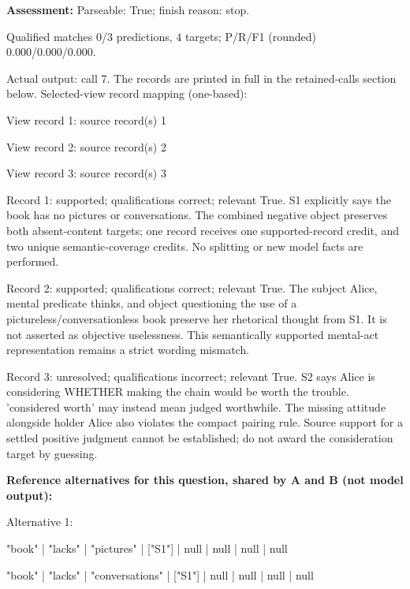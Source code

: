 \noindent\textbf{Assessment:} Parseable: True; finish reason: stop.

Qualified matches 0/3 predictions, 4 targets; P/R/F1 (rounded) 0.000/0.000/0.000.\par

Actual output: call 7. The records are printed in full in the retained-calls section below. Selected-view record mapping (one-based):

View record 1: source record(s) 1\par

View record 2: source record(s) 2\par

View record 3: source record(s) 3\par

\noindent Record 1: supported; qualifications correct; relevant True. S1 explicitly says the book has no pictures or conversations. The combined negative object preserves both absent-content targets; one record receives one supported-record credit, and two unique semantic-coverage credits. No splitting or new model facts are performed.\par\smallskip

\noindent Record 2: supported; qualifications correct; relevant True. The subject Alice, mental predicate thinks, and object questioning the use of a pictureless/conversationless book preserve her rhetorical thought from S1. It is not asserted as objective uselessness. This semantically supported mental-act representation remains a strict wording mismatch.\par\smallskip

\noindent Record 3: unresolved; qualifications incorrect; relevant True. S2 says Alice is considering WHETHER making the chain would be worth the trouble. 'considered worth' may instead mean judged worthwhile. The missing attitude alongside holder Alice also violates the compact pairing rule. Source support for a settled positive judgment cannot be established; do not award the consideration target by guessing.\par\smallskip

\noindent\textbf{Reference alternatives for this question, shared by A and B (not model output):}

\noindent Alternative 1:

"book" | "lacks" | "pictures" | ["S1"] | null | null | null | null\par\smallskip

"book" | "lacks" | "conversations" | ["S1"] | null | null | null | null\par\smallskip

